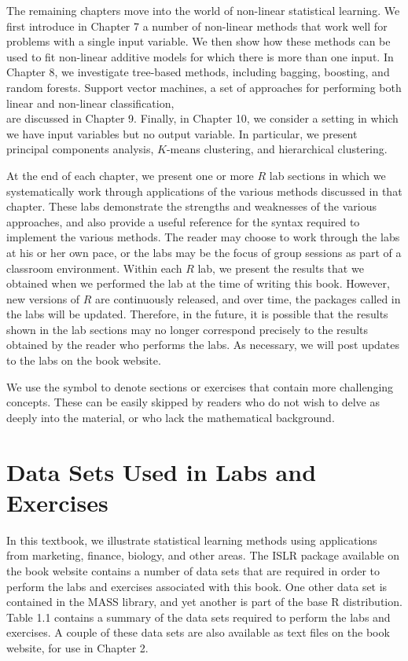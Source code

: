 \documentclass[10pt]{article}
\begin{document}
The remaining chapters move into the world of non-linear statistical learning. We first introduce in Chapter 7 a number of non-linear methods that work well for problems with a single input variable. We then show how these methods can be used to fit non-linear additive models for which there is more than one input. In Chapter 8, we investigate tree-based methods, including bagging, boosting, and random forests. Support vector machines, a set of approaches for performing both linear and non-linear classification,\\
are discussed in Chapter 9. Finally, in Chapter 10, we consider a setting in which we have input variables but no output variable. In particular, we present principal components analysis, $K$-means clustering, and hierarchical clustering.

At the end of each chapter, we present one or more $R$ lab sections in which we systematically work through applications of the various methods discussed in that chapter. These labs demonstrate the strengths and weaknesses of the various approaches, and also provide a useful reference for the syntax required to implement the various methods. The reader may choose to work through the labs at his or her own pace, or the labs may be the focus of group sessions as part of a classroom environment. Within each $R$ lab, we present the results that we obtained when we performed the lab at the time of writing this book. However, new versions of $R$ are continuously released, and over time, the packages called in the labs will be updated. Therefore, in the future, it is possible that the results shown in the lab sections may no longer correspond precisely to the results obtained by the reader who performs the labs. As necessary, we will post updates to the labs on the book website.

We use the symbol to denote sections or exercises that contain more challenging concepts. These can be easily skipped by readers who do not wish to delve as deeply into the material, or who lack the mathematical background.

\section*{Data Sets Used in Labs and Exercises}
In this textbook, we illustrate statistical learning methods using applications from marketing, finance, biology, and other areas. The ISLR package available on the book website contains a number of data sets that are required in order to perform the labs and exercises associated with this book. One other data set is contained in the MASS library, and yet another is part of the base R distribution. Table 1.1 contains a summary of the data sets required to perform the labs and exercises. A couple of these data sets are also available as text files on the book website, for use in Chapter 2.
\end{document}
